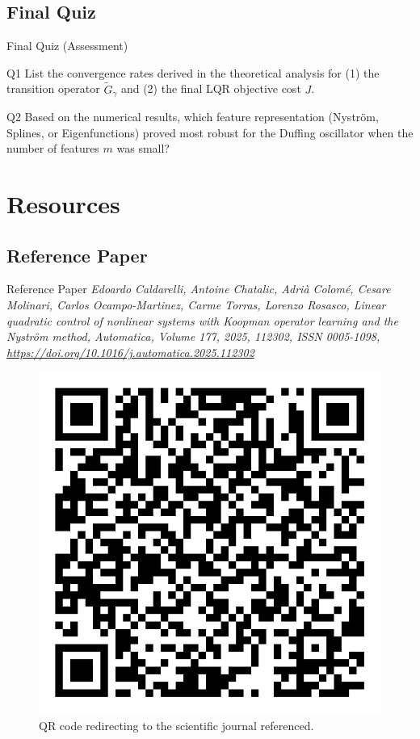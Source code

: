 \documentclass{beamer}
\begin{document}
\subsection{Final Quiz}
\begin{frame}{Final Quiz (Assessment)}
  \begin{block}{Q1}
    List the convergence rates derived in the theoretical analysis for  
    (1) the transition operator $\widetilde{G}_\gamma$  
    and (2) the final LQR objective cost $J$.
  \end{block}

  \begin{block}{Q2}
    Based on the numerical results, which feature representation 
    (Nyström, Splines, or Eigenfunctions) proved most robust for the Duffing oscillator when the number of features $m$ was small?
  \end{block}
\end{frame}

\section{Resources}

\subsection{Reference Paper}
\begin{frame}{Reference Paper}
    \textit{Edoardo Caldarelli, Antoine Chatalic, Adrià Colomé, Cesare Molinari, Carlos Ocampo-Martinez, Carme Torras, Lorenzo Rosasco,  
    Linear quadratic control of nonlinear systems with Koopman operator learning and the Nyström method,  
    Automatica, Volume 177, 2025, 112302, ISSN 0005-1098,  
    \url{https://doi.org/10.1016/j.automatica.2025.112302}}
    \begin{figure}
        \centering
        \includegraphics[width=0.25\linewidth]{paper_code.png}
        \caption{QR code redirecting to the scientific journal referenced.}
    \end{figure}
\end{frame}
\end{document}
